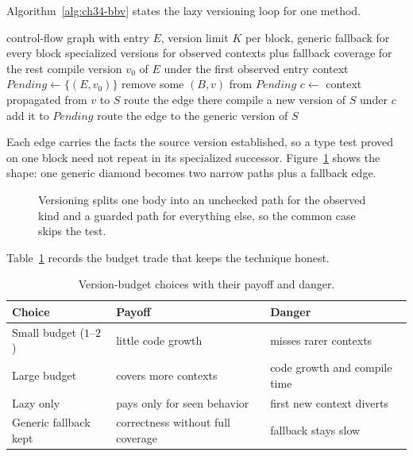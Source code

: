 Algorithm~\ref{alg:ch34-bbv} states the lazy versioning loop for one method.
\begin{algorithm}[htbp]
\caption{Lazy basic block versioning under a version budget.}
\label{alg:ch34-bbv}
\begin{pseudocode}
\Require control-flow graph with entry $E$, version limit $K$ per block, generic fallback for every block
\Ensure specialized versions for observed contexts plus fallback coverage for the rest
\State compile version $v_0$ of $E$ under the first observed entry context
\State $Pending \gets \{(E, v_0)\}$
\State remove some $(B, v)$ from $Pending$
\State $c \gets$ context propagated from $v$ to $S$
\State route the edge there
\State compile a new version of $S$ under $c$
\State add it to $Pending$
\Else
\State route the edge to the generic version of $S$
\EndIf
\EndFor
\EndWhile
\end{pseudocode}
\end{algorithm}
Each edge carries the facts the source version established, so a type test proved on one block need not repeat in its specialized successor.
Figure~\ref{fig:ch34-bbv-versions} shows the shape: one generic diamond becomes two narrow paths plus a fallback edge.
\begin{figure}[htbp]
\centering
{}
\caption{Versioning splits one body into an unchecked path for the observed kind and a guarded path for everything else, so the common case skips the test.}
\label{fig:ch34-bbv-versions}
\end{figure}
Table~\ref{tab:ch34-bbv-limits} records the budget trade that keeps the technique honest.
\begin{table}[htbp]
\centering
\caption{Version-budget choices with their payoff and danger.}
\label{tab:ch34-bbv-limits}
\begin{tabular}{lll}
\toprule
Choice & Payoff & Danger \\
\midrule
Small budget ($1$--$2$) & little code growth & misses rarer contexts \\
Large budget & covers more contexts & code growth and compile time \\
Lazy only & pays only for seen behavior & first new context diverts \\
Generic fallback kept & correctness without full coverage & fallback stays slow \\
\bottomrule
\end{tabular}
\end{table}
